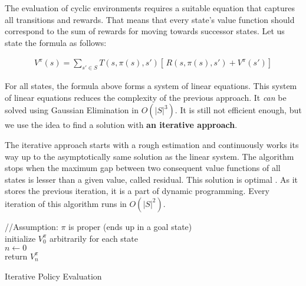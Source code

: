 The evaluation of cyclic environments requires a suitable equation that captures all transitions and rewards. That means that every state's value function should correspond to the sum of rewards for moving towards successor states. Let us state the formula as follows:


\begin{equation}
\begin{aligned}
V^{\pi} (s) = \sum_{s' \in S} T(s, \pi (s), s') [ \,R(s, \pi(s), s') + V^{\pi} (s')]
\end{aligned}
\end{equation}



For all states, the formula above forms a system of linear equations. This system of linear equations reduces the complexity of the previous approach. It \textit{can} be solved using Gaussian Elimination in $O(|S|^3)$. It is still not efficient enough, but we use the idea to find a solution with \textbf{an iterative approach}.

The iterative approach starts with a rough estimation and continuously works its way up to the asymptotically same solution as the linear system. The algorithm stops when the maximum gap between two consequent value functions of all states is lesser than a given value, called residual. This solution is optimal \cite{Kolobov2012}. As it stores the previous iteration, it is a part of dynamic programming. Every iteration of this algorithm runs in $O(|S|^2)$.

\LinesNumbered
\begin{algorithm}[ht]
\SetAlgoLined
//Assumption: $\pi$ is proper (ends up in a goal state) \\
initialize $V^{\pi}_0$ arbitrarily for each state \\
$n \xleftarrow{} 0$ \\
return $V^{\pi}_n$
\caption{Iterative Policy Evaluation}
\end{algorithm}

